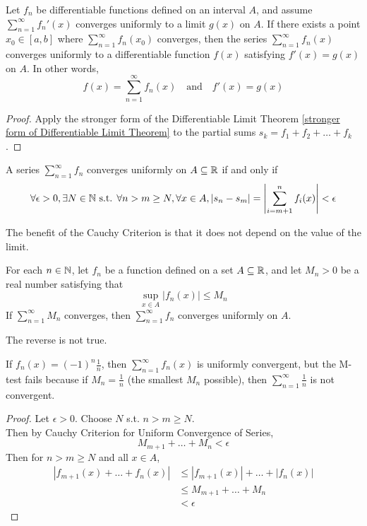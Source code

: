 \documentclass[11pt]{article}
\begin{document}
 Let $f_n$ be differentiable functions defined on an interval $A$, and assume $\sum_{n=1}^\infty f_n'(x)$ converges uniformly to a limit $g(x)$ on $A$. If there exists a point $x_0 \in [a,b]$ where $\sum_{n=1}^\infty f_n(x_0)$ converges, then the series $\sum_{n=1}^\infty f_n(x)$ converges uniformly to a differentiable function $f(x)$ satisfying $f'(x) = g(x)$ on $A$. In other words,
$$f(x) = \sum_{n=1}^\infty f_n(x) \quad \text{and} \quad f'(x) = g(x)$$
\begin{proof}
	Apply the stronger form of the Differentiable Limit Theorem \ref{stronger form of Differentiable Limit Theorem} to the partial sums $s_k = f_1 + f_2 + \hdots + f_k$.
\end{proof}

A series $\sum_{n=1}^\infty f_n$ converges uniformly on $A \subseteq \mathbb{R}$ if and only if
$$\forall \epsilon > 0, \exists N \in \mathbb{N} \text{ s.t. } \forall n > m \geq N, \forall x \in A, |s_n - s_{m}| = \left \vert {\sum_{i=m+1}^n f_i(x)} \right \vert < \epsilon$$

\remark
The benefit of the Cauchy Criterion is that it does not depend on the value of the limit.

 For each $n \in \mathbb{N}$, let $f_n$ be a function defined on a set $A \subseteq \mathbb{R}$, and let $M_n > 0$ be a real number satisfying that
$$\sup_{x \in A}|f_n(x)| \leq M_n$$
If $\sum_{n=1}^\infty M_n$ converges, then $\sum_{n=1}^\infty f_n$ converges uniformly on $A$.

\remark
The reverse is not true.

\example If $f_n(x) = (-1)^n\frac{1}{n}$, then $\sum_{n=1}^\infty f_n(x)$ is uniformly convergent, but the M-test fails because if $M_n = \frac{1}{n}$ (the smallest $M_n$ possible), then $\sum_{n=1}^\infty \frac{1}{n}$ is not convergent.


\begin{proof}
	Let $\epsilon > 0$. Choose $N$ s.t. $n > m \geq N$.\\
	Then by Cauchy Criterion for Uniform Convergence of Series, 
	$$M_{m+1} + \hdots + M_n < \epsilon$$
	Then for $n > m \geq N$ and all $x \in A$,
	\begin{align*}
		|f_{m+1}(x) + \hdots + f_n(x)| &\leq |f_{m+1}(x)| + \hdots + |f_n(x)| \\
		&\leq M_{m+1} + \hdots + M_n \\
		&< \epsilon
	\end{align*}
	
\end{proof}
\end{document}
